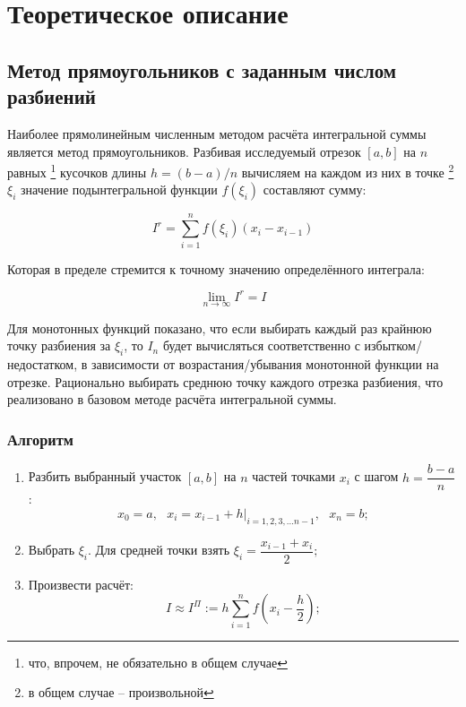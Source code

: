 \documentclass[a4paper, 14pt]{article}
\begin{document}

\setcounter{page}{2}
\tableofcontents
\clearpage

\section{Теоретическое описание}

\subsection{Метод прямоугольников с заданным числом разбиений}

Наиболее прямолинейным численным методом расчёта интегральной суммы является метод прямоугольников. Разбивая исследуемый отрезок $[a,b]$ на $n$ равных
\footnote{что, впрочем, не обязательно в общем случае}
кусочков длины $h = (b-a)/n$ вычисляем на каждом из них в точке
\footnote{в общем случае -- произвольной}
$\xi_i$ значение подынтегральной функции $f(\xi_i)$ составляют сумму:

\begin{equation}
    I^r = \sum_{i=1}^{n}f(\xi_i)(x_i-x_{i-1})
\end{equation}

Которая в пределе стремится к точному значению определённого интеграла:

\begin{equation}
    \lim_{n\to\infty}I^r = I
\end{equation}

Для монотонных функций показано, что если выбирать каждый раз крайнюю точку разбиения за $\xi_i$, то $I_n$ будет вычисляться соответственно с избытком/недостатком, в зависимости от возрастания/убывания монотонной функции на отрезке. Рационально выбирать среднюю точку каждого отрезка разбиения, что реализовано в базовом методе расчёта интегральной суммы.

\subsubsection{Алгоритм}
\begin{enumerate}
    \item Разбить выбранный участок $[a,b]$ на $n$ частей точками $x_i$ с шагом $h=\dfrac{b-a}{n}$:$$
    x_0=a,~~~x_i=x_{i-1}+h|_{i=1,2,3,...n-1},~~~ x_n=b;$$

    \item Выбрать $\xi_i$. Для средней точки взять $\xi_i=\dfrac{x_{i-1}+x_i}{2};$

    \item Произвести расчёт:
    \begin{equation}
        I\approx I^\Pi := h\sum_{i=1}^{n}f(x_i-\dfrac{h}{2});
    \end{equation}
\end{enumerate}
\end{document}
